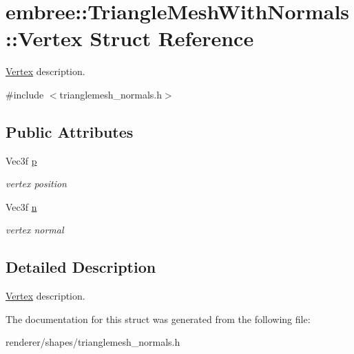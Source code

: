 \hypertarget{structembree_1_1_triangle_mesh_with_normals_1_1_vertex}{
\section{embree::TriangleMeshWithNormals::Vertex Struct Reference}
\label{structembree_1_1_triangle_mesh_with_normals_1_1_vertex}
}


\hyperlink{structembree_1_1_triangle_mesh_with_normals_1_1_vertex}{Vertex} description.  




{\ttfamily \#include $<$trianglemesh\_\-normals.h$>$}

\subsection*{Public Attributes}
\begin{DoxyCompactItemize}
\item 
\hypertarget{structembree_1_1_triangle_mesh_with_normals_1_1_vertex_a462a37875cd6464e05ffc03b4fa579a3}{
Vec3f \hyperlink{structembree_1_1_triangle_mesh_with_normals_1_1_vertex_a462a37875cd6464e05ffc03b4fa579a3}{p}}
\label{structembree_1_1_triangle_mesh_with_normals_1_1_vertex_a462a37875cd6464e05ffc03b4fa579a3}

\begin{DoxyCompactList}\small\item\em vertex position \item\end{DoxyCompactList}\item 
\hypertarget{structembree_1_1_triangle_mesh_with_normals_1_1_vertex_af0400a4f13d3018627e0490f34d505fc}{
Vec3f \hyperlink{structembree_1_1_triangle_mesh_with_normals_1_1_vertex_af0400a4f13d3018627e0490f34d505fc}{n}}
\label{structembree_1_1_triangle_mesh_with_normals_1_1_vertex_af0400a4f13d3018627e0490f34d505fc}

\begin{DoxyCompactList}\small\item\em vertex normal \item\end{DoxyCompactList}\end{DoxyCompactItemize}


\subsection{Detailed Description}
\hyperlink{structembree_1_1_triangle_mesh_with_normals_1_1_vertex}{Vertex} description. 

The documentation for this struct was generated from the following file:\begin{DoxyCompactItemize}
\item 
renderer/shapes/trianglemesh\_\-normals.h\end{DoxyCompactItemize}
